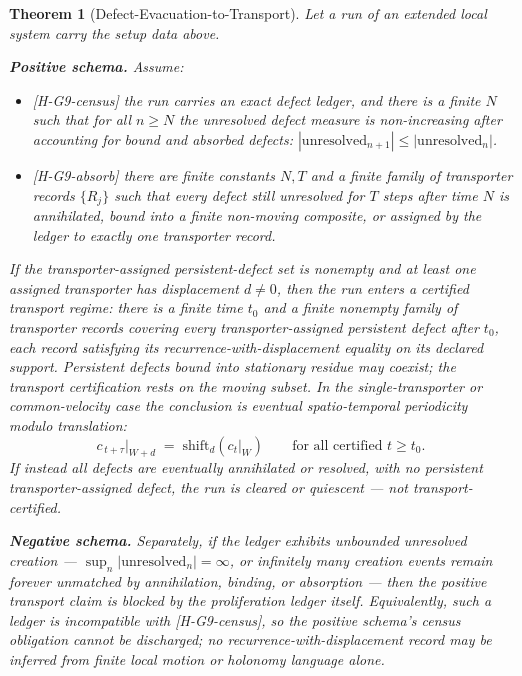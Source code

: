 \documentclass[11pt]{article}
\newcommand{\lawGNine}{Defect-Evacuation-to-Transport}
\newtheorem{theorem}{Theorem}[section]
\theoremstyle{definition}
\begin{document}
\begin{theorem}[\lawGNine]\label{thm:G9}
Let a run of an extended local system carry the setup data above.

\textbf{Positive schema.} Assume:
\begin{itemize}
  \item \textup{[H-G9-census]} the run carries an exact defect ledger, and there is a finite $N$ such
    that for all $n \ge N$ the unresolved defect measure is non-increasing after accounting for bound
    and absorbed defects: $|\mathrm{unresolved}_{n+1}| \le |\mathrm{unresolved}_n|$.
  \item \textup{[H-G9-absorb]} there are finite constants $N, T$ and a finite family of transporter
    records $\{R_j\}$ such that every defect still unresolved for $T$ steps after time $N$ is
    annihilated, bound into a finite non-moving composite, or assigned by the ledger to exactly one
    transporter record.
\end{itemize}
If the transporter-assigned persistent-defect set is nonempty and at least one assigned transporter
has displacement $d \neq 0$, then the run enters a certified transport regime: there is a finite time
$t_0$ and a finite nonempty family of transporter records covering every transporter-assigned
persistent defect after $t_0$, each record satisfying its recurrence-with-displacement equality on its
declared support. Persistent defects bound into stationary residue may coexist; the transport
certification rests on the moving subset. In the single-transporter or common-velocity case the
conclusion is eventual spatio-temporal periodicity modulo translation:
\[
  c_{\,t+\tau}\big|_{W+d} \;=\; \mathrm{shift}_d\!\left(c_t\big|_{W}\right)
  \qquad \text{for all certified } t \ge t_0.
\]
If instead all defects are eventually annihilated or resolved, with no persistent transporter-assigned
defect, the run is cleared or quiescent --- not transport-certified.

\textbf{Negative schema.} Separately, if the ledger exhibits unbounded unresolved creation ---
$\sup_n |\mathrm{unresolved}_n| = \infty$, or infinitely many creation events remain forever unmatched
by annihilation, binding, or absorption --- then the positive transport claim is blocked by the
proliferation ledger itself. Equivalently, such a ledger is incompatible with
\textup{[H-G9-census]}, so the positive schema's census obligation cannot be discharged; no
recurrence-with-displacement record may be inferred from finite local motion or holonomy language
alone.
\end{theorem}
\end{document}
